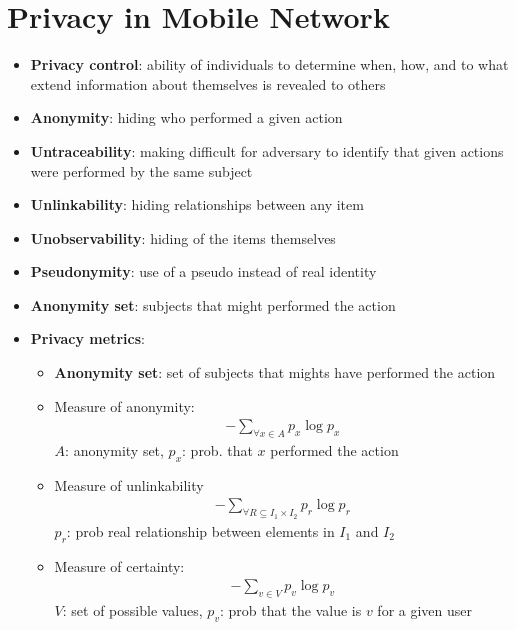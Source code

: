 \section{Privacy in Mobile Network}
\begin{itemize}
	\item \textbf{Privacy control}: ability of individuals to determine when, how, and to what extend information about themselves is revealed to others
	\item \textbf{Anonymity}: hiding who performed a given action
	\item \textbf{Untraceability}: making difficult for adversary to identify that given actions were performed by the same subject
	\item \textbf{Unlinkability}: hiding relationships between any item
	\item \textbf{Unobservability}: hiding of the items themselves
	\item \textbf{Pseudonymity}: use of a pseudo instead of real identity
	\item \textbf{Anonymity set}: subjects that might performed the action
	\item \textbf{Privacy metrics}: 
	\begin{itemize}
		\item \textbf{Anonymity set}: set of subjects that mights have performed the action
		\item Measure of anonymity:
		\begin{align*}
			- \sum_{\forall x \in A} p_x \log p_x
		\end{align*}
		$A$: anonymity set, $p_x$: prob. that $x$ performed the action
		\item Measure of unlinkability
		\begin{align*}
			- \sum_{\forall R \subseteq I_1 \times I_2 } p_r \log p_r
		\end{align*}
		$p_r$: prob real relationship between elements in $I_1$ and $I_2$
		\item Measure of certainty:
		\begin{align*}
			-\sum_{v \in V} p_v \log p_v
		\end{align*}
		$V$: set of possible values, $p_v$: prob that the value is $v$ for a given user
	\end{itemize}
\end{itemize}
